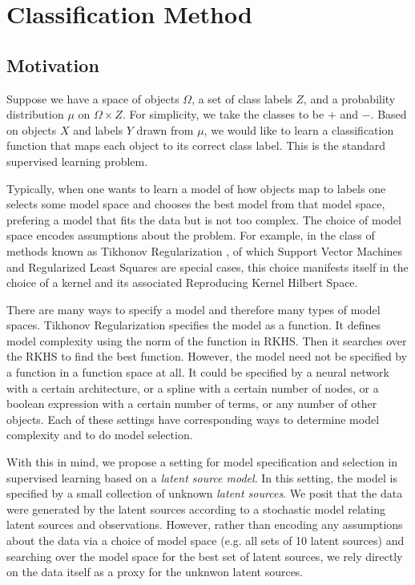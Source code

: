 \chapter{Classification Method}
\label{ch:method}

\section{Motivation}
Suppose we have a space of objects $\Omega$, a set of class labels $Z$, and a
probability distribution $\mu$ on $\Omega \times Z$. For simplicity, we take the
classes to be $+$ and $-$. Based on objects $X$ and labels $Y$ drawn from $\mu$,
we would like to learn a classification function that maps each object to its
correct class label. This is the standard supervised learning problem.

Typically, when one wants to learn a model of how objects map to labels one
selects some model space and chooses the best model from that model space,
prefering a model that fits the data but is not too complex. The choice of model
space encodes assumptions about the problem. For example, in the class of
methods known as Tikhonov Regularization \cite{Poggio}, of which Support Vector
Machines and Regularized Least Squares are special cases, this choice manifests
itself in the choice of a kernel and its associated Reproducing Kernel Hilbert
Space. 

There are many ways to specify a model and therefore many types of model
spaces. Tikhonov Regularization specifies the model as a function. It defines
model complexity using the norm of the function in RKHS. Then it searches over
the RKHS to find the best function. However, the model need not be specified by
a function in a function space at all. It could be specified by a neural network
with a certain architecture, or a spline with a certain number of nodes, or a
boolean expression with a certain number of terms, or any number of other
objects. Each of these settings have corresponding ways to determine model
complexity and to do model selection.

With this in mind, we propose a setting for model specification and selection in
supervised learning based on a {\em latent source model}. In this setting, the
model is specified by a small collection of unknown {\em latent sources}. We
posit that the data were generated by the latent sources according to a
stochastic model relating latent sources and observations. However, rather than
encoding any assumptions about the data via a choice of model space (e.g. all
sets of 10 latent sources) and searching over the model space for the best set
of latent sources, we rely directly on the data itself as a proxy for the
unknwon latent sources.

